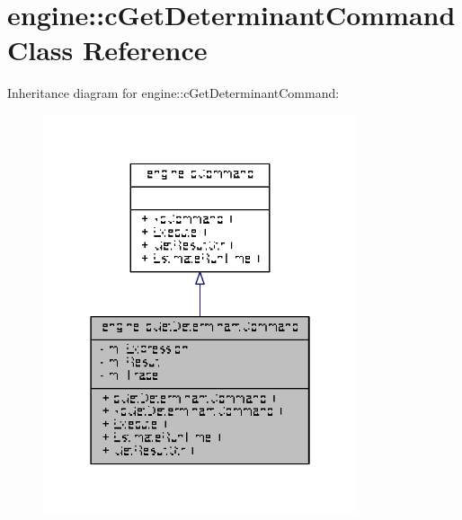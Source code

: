 \hypertarget{classengine_1_1cGetDeterminantCommand}{\section{engine\-:\-:c\-Get\-Determinant\-Command Class Reference}
\label{classengine_1_1cGetDeterminantCommand}
}


Inheritance diagram for engine\-:\-:c\-Get\-Determinant\-Command\-:
\nopagebreak
\begin{figure}[H]
\begin{center}
\leavevmode
\includegraphics[width=262pt]{classengine_1_1cGetDeterminantCommand__inherit__graph}
\end{center}
\end{figure}


